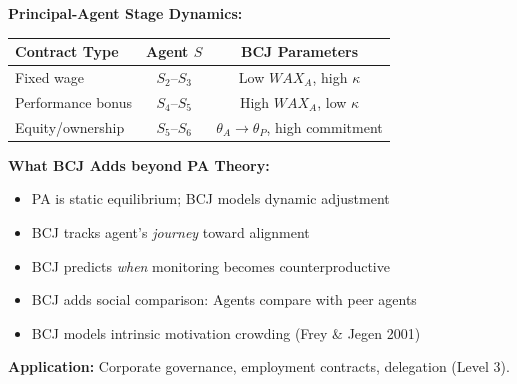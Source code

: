 \begin{tcolorbox}[colback=green!5!white, colframe=green!75!black,
    title=Theorem BCJ-T32: Principal-Agent Theory as Special Case]
\textbf{Principal-Agent Stage Dynamics:}
\begin{center}
\begin{tabular}{lcc}
\toprule
\textbf{Contract Type} & \textbf{Agent $S$} & \textbf{BCJ Parameters} \\
\midrule
Fixed wage & $S_2$--$S_3$ & Low $WAX_A$, high $\kappa$ \\
Performance bonus & $S_4$--$S_5$ & High $WAX_A$, low $\kappa$ \\
Equity/ownership & $S_5$--$S_6$ & $\theta_A \to \theta_P$, high commitment \\
\bottomrule
\end{tabular}
\end{center}

\textbf{What BCJ Adds beyond PA Theory:}
\begin{itemize}[nosep]
\item PA is static equilibrium; BCJ models dynamic adjustment
\item BCJ tracks agent's \textit{journey} toward alignment
\item BCJ predicts \textit{when} monitoring becomes counterproductive
\item BCJ adds social comparison: Agents compare with peer agents
\item BCJ models intrinsic motivation crowding (Frey \& Jegen 2001)
\end{itemize}

\textbf{Application:} Corporate governance, employment contracts, delegation (Level 3).
\end{tcolorbox}


